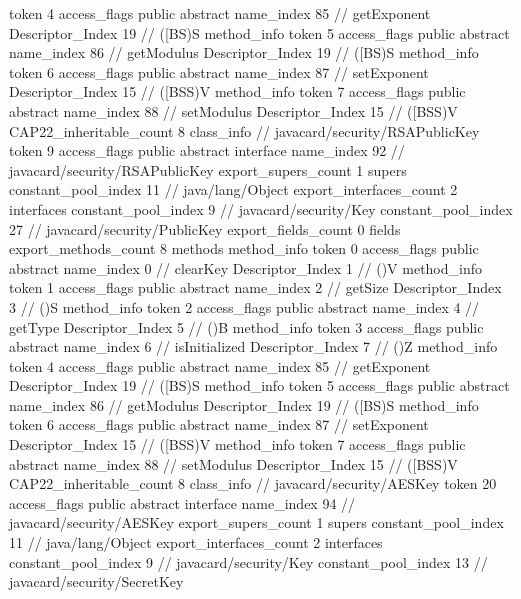 {{{{{					token	4
					access_flags	public abstract
					name_index	85		// getExponent
					Descriptor_Index	19		// ([BS)S
				}
				method_info {
					token	5
					access_flags	public abstract
					name_index	86		// getModulus
					Descriptor_Index	19		// ([BS)S
				}
				method_info {
					token	6
					access_flags	public abstract
					name_index	87		// setExponent
					Descriptor_Index	15		// ([BSS)V
				}
				method_info {
					token	7
					access_flags	public abstract
					name_index	88		// setModulus
					Descriptor_Index	15		// ([BSS)V
				}
			}
			CAP22_inheritable_count	8
		}
		class_info {		// javacard/security/RSAPublicKey
			token	9
			access_flags	public abstract interface
			name_index	92		// javacard/security/RSAPublicKey
			export_supers_count	1
			supers {
				constant_pool_index	11		// java/lang/Object
			}
			export_interfaces_count	2
			interfaces {
				constant_pool_index	9		// javacard/security/Key
				constant_pool_index	27		// javacard/security/PublicKey
			}
			export_fields_count	0
			fields {
			}
			export_methods_count	8
			methods {
				method_info {
					token	0
					access_flags	public abstract
					name_index	0		// clearKey
					Descriptor_Index	1		// ()V
				}
				method_info {
					token	1
					access_flags	public abstract
					name_index	2		// getSize
					Descriptor_Index	3		// ()S
				}
				method_info {
					token	2
					access_flags	public abstract
					name_index	4		// getType
					Descriptor_Index	5		// ()B
				}
				method_info {
					token	3
					access_flags	public abstract
					name_index	6		// isInitialized
					Descriptor_Index	7		// ()Z
				}
				method_info {
					token	4
					access_flags	public abstract
					name_index	85		// getExponent
					Descriptor_Index	19		// ([BS)S
				}
				method_info {
					token	5
					access_flags	public abstract
					name_index	86		// getModulus
					Descriptor_Index	19		// ([BS)S
				}
				method_info {
					token	6
					access_flags	public abstract
					name_index	87		// setExponent
					Descriptor_Index	15		// ([BSS)V
				}
				method_info {
					token	7
					access_flags	public abstract
					name_index	88		// setModulus
					Descriptor_Index	15		// ([BSS)V
				}
			}
			CAP22_inheritable_count	8
		}
		class_info {		// javacard/security/AESKey
			token	20
			access_flags	public abstract interface
			name_index	94		// javacard/security/AESKey
			export_supers_count	1
			supers {
				constant_pool_index	11		// java/lang/Object
			}
			export_interfaces_count	2
			interfaces {
				constant_pool_index	9		// javacard/security/Key
				constant_pool_index	13		// javacard/security/SecretKey
}}}}
